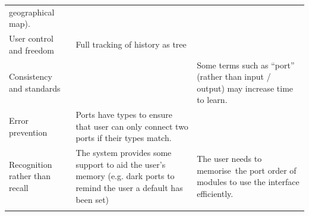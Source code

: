 {\begin{longtable}[c]{@{}lll@{}}
\begin{minipage}[t]{0.30\columnwidth}
{geographical map).}
\strut\end{minipage}\tabularnewline
\begin{minipage}[t]{0.30\columnwidth}\raggedright\strut
{User control and freedom}
\strut\end{minipage} &
\begin{minipage}[t]{0.30\columnwidth}\raggedright\strut
{Full tracking of history as tree}
\strut\end{minipage} &
\begin{minipage}[t]{0.30\columnwidth}\raggedright\strut
{}
\strut\end{minipage}\tabularnewline
\begin{minipage}[t]{0.30\columnwidth}\raggedright\strut
{Consistency and standards}
\strut\end{minipage} &
\begin{minipage}[t]{0.30\columnwidth}\raggedright\strut
{}
\strut\end{minipage} &
\begin{minipage}[t]{0.30\columnwidth}\raggedright\strut
{Some terms such as ``port'' (rather than input / output) may increase
time to learn.}
\strut\end{minipage}\tabularnewline
\begin{minipage}[t]{0.30\columnwidth}\raggedright\strut
{Error prevention}
\strut\end{minipage} &
\begin{minipage}[t]{0.30\columnwidth}\raggedright\strut
{Ports have types to ensure that user can only connect two ports if
their types match.}
\strut\end{minipage} &
\begin{minipage}[t]{0.30\columnwidth}\raggedright\strut
{}
\strut\end{minipage}\tabularnewline
\begin{minipage}[t]{0.30\columnwidth}\raggedright\strut
{Recognition rather than recall}
\strut\end{minipage} &
\begin{minipage}[t]{0.30\columnwidth}\raggedright\strut
{The system provides some support to aid the user's memory (e.g. dark
ports to remind the user a default has been set)}
\strut\end{minipage} &
\begin{minipage}[t]{0.30\columnwidth}\raggedright\strut
{The user needs to memorise}{~}{the port order of modules to use the
interface efficiently.}
\strut\end{minipage}\tabularnewline
\begin{minipage}[t]{0.30\columnwidth}\raggedright\strut

\end{minipage}
\end{longtable}}
